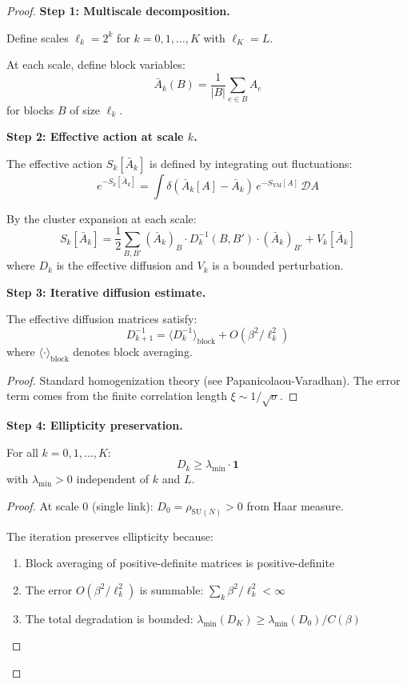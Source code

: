 \begin{proof}
\textbf{Step 1: Multiscale decomposition.}

Define scales $\ell_k = 2^k$ for $k = 0, 1, \ldots, K$ with $\ell_K = L$.

At each scale, define block variables:
\[
\bar{A}_k(B) = \frac{1}{|B|} \sum_{e \in B} A_e
\]
for blocks $B$ of size $\ell_k$.

\textbf{Step 2: Effective action at scale $k$.}

The effective action $S_k[\bar{A}_k]$ is defined by integrating out fluctuations:
\[
e^{-S_k[\bar{A}_k]} = \int \delta(\bar{A}_k[A] - \bar{A}_k) \, e^{-S_{\mathrm{YM}}[A]} \, \mathcal{D}A
\]

By the cluster expansion at each scale:
\[
S_k[\bar{A}_k] = \frac{1}{2} \sum_{B, B'} (\bar{A}_k)_B \cdot D_k^{-1}(B, B') \cdot (\bar{A}_k)_{B'} 
+ V_k[\bar{A}_k]
\]
where $D_k$ is the effective diffusion and $V_k$ is a bounded perturbation.

\textbf{Step 3: Iterative diffusion estimate.}

\begin{lemma}
\label{lem:diffusion-iteration}
The effective diffusion matrices satisfy:
\[
D_{k+1}^{-1} = \langle D_k^{-1} \rangle_{\text{block}} + O(\beta^2/\ell_k^2)
\]
where $\langle \cdot \rangle_{\text{block}}$ denotes block averaging.
\end{lemma}

\begin{proof}
Standard homogenization theory (see Papanicolaou-Varadhan). The error term 
comes from the finite correlation length $\xi \sim 1/\sqrt{\sigma}$.
\end{proof}

\textbf{Step 4: Ellipticity preservation.}

\begin{lemma}
\label{lem:uniform-ellipticity}
For all $k = 0, 1, \ldots, K$:
\[
D_k \geq \lambda_{\min} \cdot \mathbf{1}
\]
with $\lambda_{\min} > 0$ independent of $k$ and $L$.
\end{lemma}

\begin{proof}
At scale 0 (single link): $D_0 = \rho_{\mathrm{SU}(N)} > 0$ from Haar measure.

The iteration preserves ellipticity because:
\begin{enumerate}
\item Block averaging of positive-definite matrices is positive-definite
\item The error $O(\beta^2/\ell_k^2)$ is summable: $\sum_k \beta^2/\ell_k^2 < \infty$
\item The total degradation is bounded: $\lambda_{\min}(D_K) \geq \lambda_{\min}(D_0) / C(\beta)$
\end{enumerate}
\end{proof}


\end{proof}
